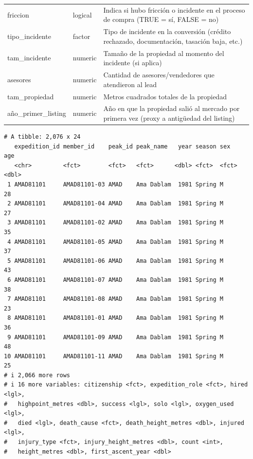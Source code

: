 \documentclass[
  letterpaper,
  DIV=11,
  numbers=noendperiod]{scrartcl}
\begin{document}
\begin{longtable}[t]{lll}
friccion & logical & Indica si hubo fricción o incidente en el proceso de compra (TRUE = sí, FALSE = no)\\
tipo\_incidente & factor & Tipo de incidente en la conversión (crédito rechazado, documentación, tasación baja, etc.)\\
\addlinespace
tam\_incidente & numeric & Tamaño de la propiedad al momento del incidente (si aplica)\\
asesores & numeric & Cantidad de asesores/vendedores que atendieron al lead\\
tam\_propiedad & numeric & Metros cuadrados totales de la propiedad\\
año\_primer\_listing & numeric & Año en que la propiedad salió al mercado por primera vez (proxy a antigüedad del listing)\\
\bottomrule
\end{longtable}
\endgroup{}

\begin{verbatim}
# A tibble: 2,076 x 24
   expedition_id member_id    peak_id peak_name   year season sex     age
   <chr>         <fct>        <fct>   <fct>      <dbl> <fct>  <fct> <dbl>
 1 AMAD81101     AMAD81101-03 AMAD    Ama Dablam  1981 Spring M        28
 2 AMAD81101     AMAD81101-04 AMAD    Ama Dablam  1981 Spring M        27
 3 AMAD81101     AMAD81101-02 AMAD    Ama Dablam  1981 Spring M        35
 4 AMAD81101     AMAD81101-05 AMAD    Ama Dablam  1981 Spring M        37
 5 AMAD81101     AMAD81101-06 AMAD    Ama Dablam  1981 Spring M        43
 6 AMAD81101     AMAD81101-07 AMAD    Ama Dablam  1981 Spring M        38
 7 AMAD81101     AMAD81101-08 AMAD    Ama Dablam  1981 Spring M        23
 8 AMAD81101     AMAD81101-01 AMAD    Ama Dablam  1981 Spring M        36
 9 AMAD81101     AMAD81101-09 AMAD    Ama Dablam  1981 Spring M        48
10 AMAD81101     AMAD81101-11 AMAD    Ama Dablam  1981 Spring M        25
# i 2,066 more rows
# i 16 more variables: citizenship <fct>, expedition_role <fct>, hired <lgl>,
#   highpoint_metres <dbl>, success <lgl>, solo <lgl>, oxygen_used <lgl>,
#   died <lgl>, death_cause <fct>, death_height_metres <dbl>, injured <lgl>,
#   injury_type <fct>, injury_height_metres <dbl>, count <int>,
#   height_metres <dbl>, first_ascent_year <dbl>
\end{verbatim}
\end{document}
